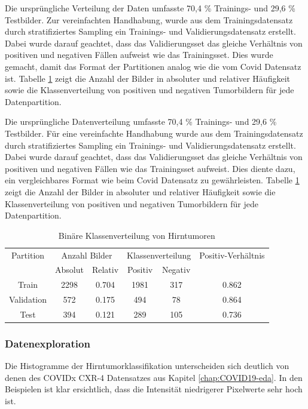 Die ursprüngliche Verteilung der Daten umfasste 70,4 \% Trainings- und 29,6 \% Testbilder. Zur vereinfachten Handhabung, wurde aus dem Trainingsdatensatz durch stratifiziertes Sampling ein Trainings- und Validierungsdatensatz erstellt. Dabei wurde darauf geachtet, dass das Validierungsset das gleiche Verhältnis von positiven und negativen Fällen aufweist wie das Trainingsset. Dies wurde gemacht, damit das Format der Partitionen analog wie die vom Covid Datensatz ist. Tabelle \ref{tab:brain-binaere-klassenverteilung} zeigt die Anzahl der Bilder in absoluter und relativer Häufigkeit sowie die Klassenverteilung von positiven und negativen Tumorbildern für jede Datenpartition.

Die ursprüngliche Datenverteilung umfasste 70,4 \% Trainings- und 29,6 \% Testbilder. Für eine vereinfachte Handhabung wurde aus dem Trainingsdatensatz durch stratifiziertes Sampling ein Trainings- und Validierungsdatensatz erstellt. Dabei wurde darauf geachtet, dass das Validierungsset das gleiche Verhältnis von positiven und negativen Fällen wie das Trainingsset aufweist. Dies diente dazu, ein vergleichbares Format wie beim Covid Datensatz zu gewährleisten. Tabelle \ref{tab:brain-binaere-klassenverteilung} zeigt die Anzahl der Bilder in absoluter und relativer Häufigkeit sowie die Klassenverteilung von positiven und negativen Tumorbildern für jede Datenpartition.

\begin{table}[H]
    \centering
    \begin{tabular}{@{}cccccc@{}}
        \toprule
        Partition & \multicolumn{2}{c}{Anzahl Bilder} & \multicolumn{2}{c}{Klassenverteilung} & Positiv-Verhältnis\\ 
        \cmidrule(lr){2-3} \cmidrule(lr){4-5} 
                   & Absolut & Relativ & Positiv & Negativ  \\ 
        \midrule
        Train      & 2298 & 0.704 & 1981 & 317 & 0.862      \\
        Validation & 572  & 0.175 & 494  & 78  & 0.864      \\
        Test       & 394  & 0.121 & 289  & 105 & 0.736      \\ 
        \bottomrule
    \end{tabular}
    \caption{Binäre Klassenverteilung von Hirntumoren}
    \label{tab:brain-binaere-klassenverteilung}
\end{table}

\subsubsection{Datenexploration} \label{chap:brain-eda}
Die Histogramme der Hirntumorklassifikation unterscheiden sich deutlich von denen des COVIDx CXR-4 Datensatzes aus Kapitel \ref{chap:COVID19-eda}. In den Beispielen ist klar ersichtlich, dass die Intensität niedrigerer Pixelwerte sehr hoch ist.

